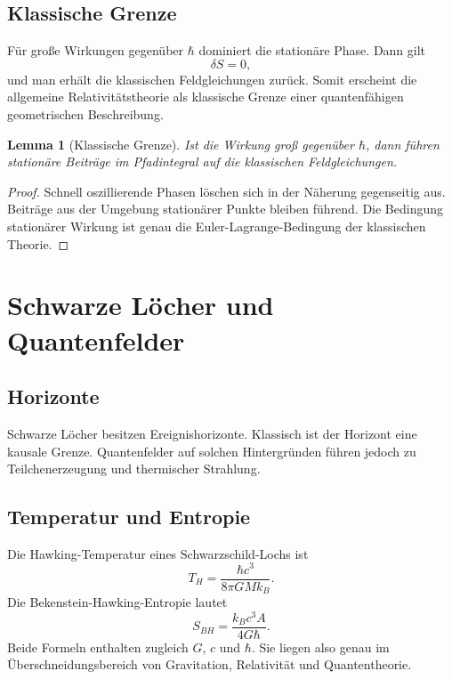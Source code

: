 \documentclass[11pt,a4paper,openany]{book}
\newtheorem{lemma}{Lemma}[chapter]
\theoremstyle{remark}
\begin{document}
\section{Klassische Grenze}
Für große Wirkungen gegenüber $\hbar$ dominiert die stationäre Phase. Dann gilt
\begin{equation}
\delta S=0,
\end{equation}
und man erhält die klassischen Feldgleichungen zurück. Somit erscheint die allgemeine Relativitätstheorie als klassische Grenze einer quantenfähigen geometrischen Beschreibung.

\begin{lemma}[Klassische Grenze]
Ist die Wirkung groß gegenüber $\hbar$, dann führen stationäre Beiträge im Pfadintegral auf die klassischen Feldgleichungen.
\end{lemma}
\begin{proof}
Schnell oszillierende Phasen löschen sich in der Näherung gegenseitig aus. Beiträge aus der Umgebung stationärer Punkte bleiben führend. Die Bedingung stationärer Wirkung ist genau die Euler-Lagrange-Bedingung der klassischen Theorie.
\end{proof}

\chapter{Schwarze Löcher und Quantenfelder}
\section{Horizonte}
Schwarze Löcher besitzen Ereignishorizonte. Klassisch ist der Horizont eine kausale Grenze. Quantenfelder auf solchen Hintergründen führen jedoch zu Teilchenerzeugung und thermischer Strahlung.

\section{Temperatur und Entropie}
Die Hawking-Temperatur eines Schwarzschild-Lochs ist
\begin{equation}
T_H=\frac{\hbar c^3}{8\pi G M k_B}.
\end{equation}
Die Bekenstein-Hawking-Entropie lautet
\begin{equation}
S_{BH}=\frac{k_B c^3 A}{4G\hbar}.
\end{equation}
Beide Formeln enthalten zugleich $G$, $c$ und $\hbar$. Sie liegen also genau im Überschneidungsbereich von Gravitation, Relativität und Quantentheorie.
\end{document}
